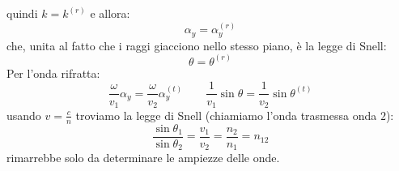quindi $k=k^{(r)}$ e allora:
\begin{equation*}
\alpha_y = \alpha_y^{(r)}
\end{equation*}
che, unita al fatto che i raggi giacciono nello stesso piano, è la legge di Snell:
\begin{equation}
\theta=\theta^{(r)}
\end{equation}
Per l'onda rifratta:
\begin{equation*}
\frac{\omega}{v_1}\alpha_y=\frac{\omega}{v_2}\alpha_y^{(t)}
\qquad
\frac{1}{v_1}\sin\theta=\frac{1}{v_2}\sin\theta^{(t)}
\end{equation*}
usando $v=\frac{c}{n}$ troviamo la legge di Snell (chiamiamo l'onda trasmessa onda $2$):
\begin{equation}
\frac{\sin\theta_1}{\sin\theta_2}=\frac{v_1}{v_2}=\frac{n_2}{n_1}=n_{12}
\end{equation}
rimarrebbe solo da determinare le ampiezze delle onde.



